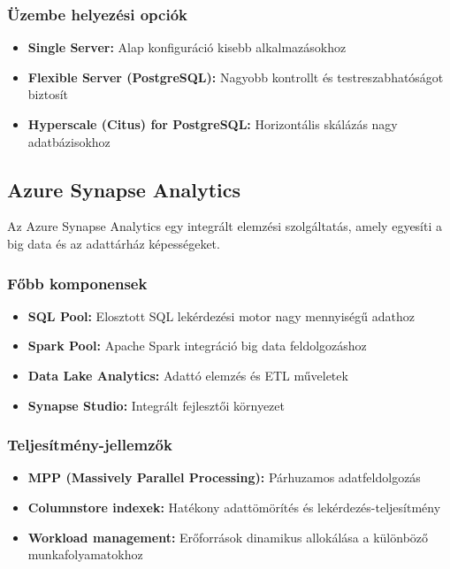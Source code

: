 \documentclass[a4paper,12pt]{article}
\begin{document}
    \subsubsection{Üzembe helyezési opciók}

    \begin{itemize}
        \item \textbf{Single Server:} Alap konfiguráció kisebb alkalmazásokhoz
        \item \textbf{Flexible Server (PostgreSQL):} Nagyobb kontrollt és testreszabhatóságot biztosít
        \item \textbf{Hyperscale (Citus) for PostgreSQL:} Horizontális skálázás nagy adatbázisokhoz
    \end{itemize}

    \subsection{Azure Synapse Analytics}

    Az Azure Synapse Analytics egy integrált elemzési szolgáltatás, amely egyesíti a big data és az adattárház képességeket.

    \subsubsection{Főbb komponensek}

    \begin{itemize}
        \item \textbf{SQL Pool:} Elosztott SQL lekérdezési motor nagy mennyiségű adathoz
        \item \textbf{Spark Pool:} Apache Spark integráció big data feldolgozáshoz
        \item \textbf{Data Lake Analytics:} Adattó elemzés és ETL műveletek
        \item \textbf{Synapse Studio:} Integrált fejlesztői környezet
    \end{itemize}

    \subsubsection{Teljesítmény-jellemzők}

    \begin{itemize}
        \item \textbf{MPP (Massively Parallel Processing):} Párhuzamos adatfeldolgozás
        \item \textbf{Columnstore indexek:} Hatékony adattömörítés és lekérdezés-teljesítmény
        \item \textbf{Workload management:} Erőforrások dinamikus allokálása a különböző munkafolyamatokhoz
    \end{itemize}
\end{document}
